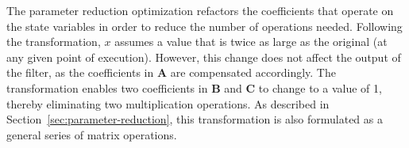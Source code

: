 The parameter reduction optimization refactors the coefficients that
operate on the state variables in order to reduce the number of
operations needed.  Following the transformation, $x$ assumes a value
that is twice as large as the original (at any given point of
execution).  However, this change does not affect the output of the
filter, as the coefficients in $\mathbf{A}$ are compensated
accordingly.  The transformation enables two coefficients in
$\mathbf{B}$ and $\mathbf{C}$ to change to a value of 1, thereby
eliminating two multiplication operations.  As described in
Section~\ref{sec:parameter-reduction}, this transformation is also
formulated as a general series of matrix operations.




